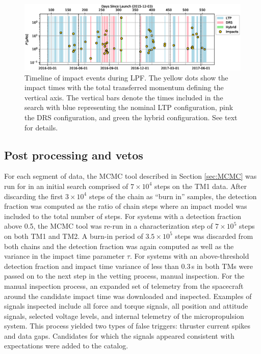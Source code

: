 \documentclass[twocolumn, trackchanges]{aastex62}
\begin{document}
\begin{figure}[t]
\includegraphics[width=\textwidth]{figures/timeline.eps} 
\caption{Timeline of impact events during LPF. The yellow dots show the impact times with the total transferred momentum defining the vertical axis. The vertical bars denote the times included in the search with blue representing the nominal LTP configuration, pink the DRS configuration, and green the hybrid configuration. See text for details. \label{fig:timeline}}
\end{figure}

\subsection{Post processing and vetos}\label{sec:vetos}
For each segment of data, the MCMC tool described in Section \ref{sec:MCMC} was run for in an initial search comprised of $7\times10^4$ steps on the TM1 data. After discarding the first $3\times10^4$ steps of the chain as ``burn in'' samples, the detection fraction was computed as the ratio of chain steps where an impact model was included to the total number of steps.  For systems with a detection fraction above 0.5, the MCMC tool was re-run in a characterization step of $7\times10^5$ steps on both TM1 and TM2. A burn-in period of $3.5\times10^5$ steps was discarded from both chains and the detection fraction was again computed as well as the variance in the impact time parameter $\tau$.  For systems with an above-threshold detection fraction and impact time variance of less than 0.3\,s in both TMs were passed on to the next step in the vetting process, manual inspection.  For the manual inspection process, an expanded set of telemetry from the spacecraft around the candidate impact time was downloaded and inspected.  Examples of signals inspected include all force and torque signals, all position and attitude signals, selected voltage levels, and internal telemetry of the micropropulsion system. This process yielded two types of false triggers: thruster current spikes and data gaps. Candidates for which the signals appeared consistent with expectations were added to the catalog.
\end{document}
